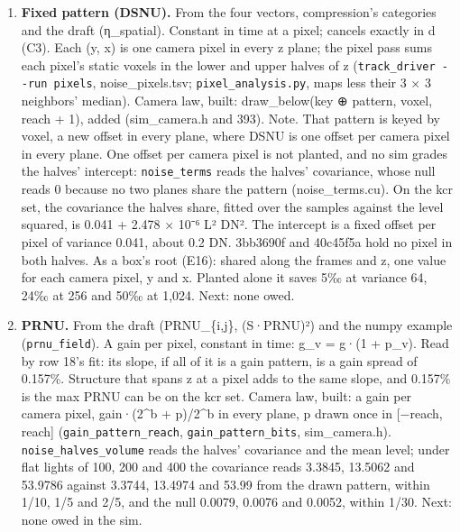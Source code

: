 \begin{enumerate}
\item \textbf{Fixed pattern (DSNU).} From the four vectors, compression's categories and the draft (η\_\allowbreak{}spatial). Constant in time at a pixel; cancels exactly in d (C3). Each (y, x) is one camera pixel in every z plane; the pixel pass sums each pixel's static voxels in the lower and upper halves of z (\texttt{track\_\allowbreak{}driver -\allowbreak{}-\allowbreak{}run pixels}, noise\_\allowbreak{}pixels.tsv; \texttt{pixel\_\allowbreak{}analysis.\allowbreak{}py}, maps less their 3 × 3 neighbors' median). Camera law, built: draw\_\allowbreak{}below(key ⊕ pattern, voxel, reach + 1), added (sim\_\allowbreak{}camera.h and 393). Note. That pattern is keyed by voxel, a new offset in every plane, where DSNU is one offset per camera pixel in every plane. One offset per camera pixel is not planted, and no sim grades the halves' intercept: \texttt{noise\_\allowbreak{}terms} reads the halves' covariance, whose null reads 0 because no two planes share the pattern (noise\_\allowbreak{}terms.cu). On the kcr set, the covariance the halves share, fitted over the samples against the level squared, is 0.041 + 2.478 × 10⁻⁶ L² DN². The intercept is a fixed offset per pixel of variance 0.041, about 0.2 DN. 3bb3690f and 40c45f5a hold no pixel in both halves. As a box's root (E16): shared along the frames and z, one value for each camera pixel, y and x. Planted alone it saves 5‰ at variance 64, 24‰ at 256 and 50‰ at 1,024. Next: none owed.
\item \textbf{PRNU.} From the draft (PRNU\_\allowbreak{}\{i,j\}, (S·PRNU)²) and the numpy example (\texttt{prnu\_\allowbreak{}field}). A gain per pixel, constant in time: g\_\allowbreak{}v = g·(1 + p\_\allowbreak{}v). Read by row 18's fit: its slope, if all of it is a gain pattern, is a gain spread of 0.157\%. Structure that spans z at a pixel adds to the same slope, and 0.157\% is the max PRNU can be on the kcr set. Camera law, built: a gain per camera pixel, gain·(2\textasciicircum{}b + p)/2\textasciicircum{}b in every plane, p drawn once in [−reach, reach] (\texttt{gain\_\allowbreak{}pattern\_\allowbreak{}reach}, \texttt{gain\_\allowbreak{}pattern\_\allowbreak{}bits}, sim\_\allowbreak{}camera.h). \texttt{noise\_\allowbreak{}halves\_\allowbreak{}volume} reads the halves' covariance and the mean level; under flat lights of 100, 200 and 400 the covariance reads 3.3845, 13.5062 and 53.9786 against 3.3744, 13.4974 and 53.99 from the drawn pattern, within 1/10, 1/5 and 2/5, and the null 0.0079, 0.0076 and 0.0052, within 1/30. Next: none owed in the sim.


\end{enumerate}
